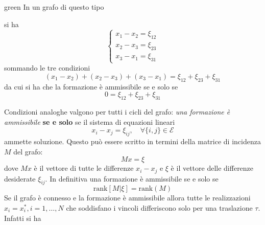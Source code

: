 \begin{itemize}
\begin{mybox}[breakable]{green}{}
\label{exmp:formaz}
In un grafo di questo tipo
\begin{center}
\end{center}
si ha
\begin{equation*}
\begin{cases}
x_1 - x_2 = \xi_{12} \\
x_2 - x_3 = \xi_{23} \\
x_3 - x_1 = \xi_{31}
\end{cases}
\end{equation*} 
sommando le tre condizioni
\begin{equation*}
(x_1 - x_2) + (x_2 - x_3) + (x_3 - x_1) = \xi_{12} + \xi_{23} + \xi_{31}
\end{equation*} da cui si ha che la formazione \`e ammissibile se e solo se
\begin{equation*}
0 = \xi_{12} + \xi_{23} + \xi_{31}
\end{equation*}
\end{mybox}
Condizioni analoghe valgono per tutti i cicli del grafo: \textit{una formazione \`e ammissibile} \textbf{se e solo} se il sistema di equazioni lineari
\begin{equation}
x_i - x_j = \xi_{ij}, \quad \forall \{i,j\} \in \mathcal{E}
\end{equation} ammette soluzione.
Questo pu\`o essere scritto in termini della matrice di incidenza $M$ del grafo:
\begin{equation}
Mx = \xi
\end{equation} dove $Mx$ \`e il vettore di tutte le differenze $x_i - x_j$ e $\xi$ \`e il vettore delle differenze desiderate $\xi_{ij}$.
In definitiva una formazione \`e ammissibile se e solo se 
\begin{equation}
\text{rank} [M | \xi] = \text{rank}(M)
\end{equation}
Se il grafo \`e connesso e la formazione \`e ammissibile allora tutte le realizzazioni $x_i = x_i^*, i=1,\dots,N$ che soddisfano i vincoli differiscono solo per una traslazione $\tau$. Infatti si ha

\end{itemize}
